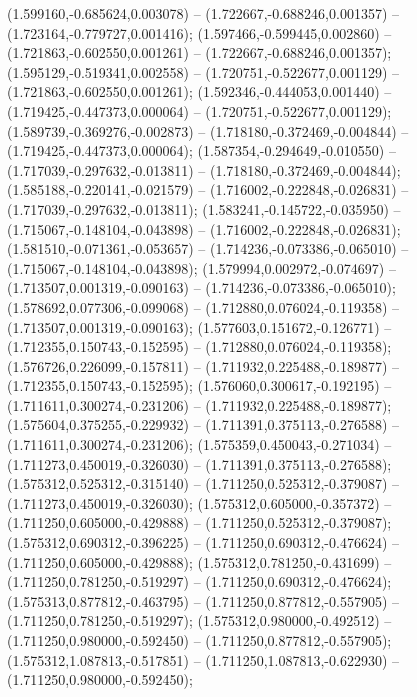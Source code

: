  (1.599160,-0.685624,0.003078) -- (1.722667,-0.688246,0.001357) -- (1.723164,-0.779727,0.001416);
 (1.597466,-0.599445,0.002860) -- (1.721863,-0.602550,0.001261) -- (1.722667,-0.688246,0.001357);
 (1.595129,-0.519341,0.002558) -- (1.720751,-0.522677,0.001129) -- (1.721863,-0.602550,0.001261);
 (1.592346,-0.444053,0.001440) -- (1.719425,-0.447373,0.000064) -- (1.720751,-0.522677,0.001129);
 (1.589739,-0.369276,-0.002873) -- (1.718180,-0.372469,-0.004844) -- (1.719425,-0.447373,0.000064);
 (1.587354,-0.294649,-0.010550) -- (1.717039,-0.297632,-0.013811) -- (1.718180,-0.372469,-0.004844);
 (1.585188,-0.220141,-0.021579) -- (1.716002,-0.222848,-0.026831) -- (1.717039,-0.297632,-0.013811);
 (1.583241,-0.145722,-0.035950) -- (1.715067,-0.148104,-0.043898) -- (1.716002,-0.222848,-0.026831);
 (1.581510,-0.071361,-0.053657) -- (1.714236,-0.073386,-0.065010) -- (1.715067,-0.148104,-0.043898);
 (1.579994,0.002972,-0.074697) -- (1.713507,0.001319,-0.090163) -- (1.714236,-0.073386,-0.065010);
 (1.578692,0.077306,-0.099068) -- (1.712880,0.076024,-0.119358) -- (1.713507,0.001319,-0.090163);
 (1.577603,0.151672,-0.126771) -- (1.712355,0.150743,-0.152595) -- (1.712880,0.076024,-0.119358);
 (1.576726,0.226099,-0.157811) -- (1.711932,0.225488,-0.189877) -- (1.712355,0.150743,-0.152595);
 (1.576060,0.300617,-0.192195) -- (1.711611,0.300274,-0.231206) -- (1.711932,0.225488,-0.189877);
 (1.575604,0.375255,-0.229932) -- (1.711391,0.375113,-0.276588) -- (1.711611,0.300274,-0.231206);
 (1.575359,0.450043,-0.271034) -- (1.711273,0.450019,-0.326030) -- (1.711391,0.375113,-0.276588);
 (1.575312,0.525312,-0.315140) -- (1.711250,0.525312,-0.379087) -- (1.711273,0.450019,-0.326030);
 (1.575312,0.605000,-0.357372) -- (1.711250,0.605000,-0.429888) -- (1.711250,0.525312,-0.379087);
 (1.575312,0.690312,-0.396225) -- (1.711250,0.690312,-0.476624) -- (1.711250,0.605000,-0.429888);
 (1.575312,0.781250,-0.431699) -- (1.711250,0.781250,-0.519297) -- (1.711250,0.690312,-0.476624);
 (1.575313,0.877812,-0.463795) -- (1.711250,0.877812,-0.557905) -- (1.711250,0.781250,-0.519297);
 (1.575312,0.980000,-0.492512) -- (1.711250,0.980000,-0.592450) -- (1.711250,0.877812,-0.557905);
 (1.575312,1.087813,-0.517851) -- (1.711250,1.087813,-0.622930) -- (1.711250,0.980000,-0.592450);
